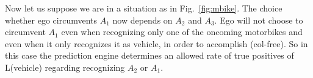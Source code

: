 Now let us suppose we are in a situation as in Fig.~\ref{fig:mbike}. The choice whether ego circumvents $A_1$ now depends on $A_2$ and $A_3$. Ego will not choose to circumvent $A_1$ even when recognizing only one of the oncoming motorbikes and even when it only recognizes it as vehicle, in order to accomplish (col-free). So in this case the prediction engine determines an allowed rate of true positives of L(vehicle) regarding recognizing $A_2$ or $A_1$.
